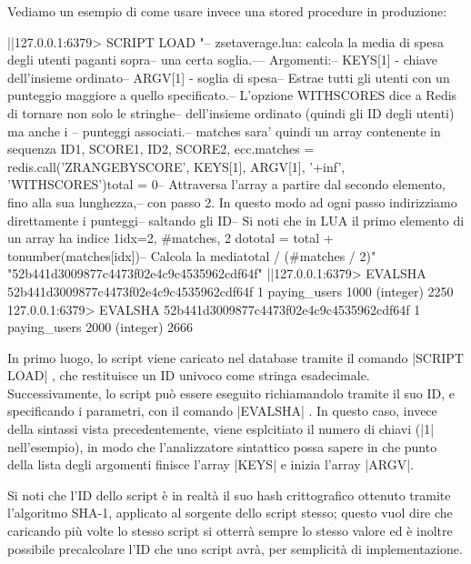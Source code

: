 Vediamo un esempio di come usare invece una stored procedure in produzione:

\begin{commentedsource}[style=redis]
|\lnote|127.0.0.1:6379> SCRIPT LOAD "-- zsetaverage.lua: calcola la media di spesa degli utenti paganti sopra\n-- una certa soglia.\n--\n-- Argomenti:\n--     KEYS[1] - chiave dell'insieme ordinato\n--     ARGV[1] - soglia di spesa\n\n-- Estrae tutti gli utenti con un punteggio maggiore a quello specificato.\n-- L'opzione WITHSCORES dice a Redis di tornare non solo le stringhe\n-- dell'insieme ordinato (quindi gli ID degli utenti) ma anche i \n-- punteggi associati.\n-- matches sara' quindi un array contenente in sequenza ID1, SCORE1, ID2, SCORE2, ecc.\nlocal matches = redis.call('ZRANGEBYSCORE', KEYS[1], ARGV[1], '+inf', 'WITHSCORES')\n\nlocal total = 0\n\n-- Attraversa l'array a partire dal secondo elemento, fino alla sua lunghezza,\n-- con passo 2. In questo modo ad ogni passo indirizziamo direttamente i punteggi\n-- saltando gli ID\n-- Si noti che in LUA il primo elemento di un array ha indice 1\nfor idx=2, #matches, 2 do\n    total = total + tonumber(matches[idx])\nend\n\n-- Calcola la media\nreturn total / (#matches / 2)\n"
"52b441d3009877c4473f02e4c9c4535962cdf64f"
|\lnote|127.0.0.1:6379> EVALSHA 52b441d3009877c4473f02e4c9c4535962cdf64f 1 paying_users 1000
(integer) 2250
127.0.0.1:6379> EVALSHA 52b441d3009877c4473f02e4c9c4535962cdf64f 1 paying_users 2000
(integer) 2666
\end{commentedsource}

In primo luogo, lo script viene caricato nel database tramite il comando \cverb|SCRIPT LOAD|
, che restituisce un ID univoco come stringa esadecimale. Successivamente, lo script può
essere eseguito richiamandolo tramite il suo ID, e specificando i parametri, con il comando
\cverb|EVALSHA| . In questo caso, invece della sintassi vista precedentemente,
viene esplcitiato il numero di chiavi (\cverb|1| nell'esempio), in modo che l'analizzatore
sintattico possa sapere in che punto della lista degli argomenti finisce l'array \cverb|KEYS| e
inizia l'array \cverb|ARGV|.

Si noti che l'ID dello script è in realtà il suo hash crittografico ottenuto tramite l'algoritmo
SHA-1, applicato al sorgente dello script stesso; questo vuol dire che caricando più volte lo stesso
script si otterrà sempre lo stesso valore ed è inoltre possibile precalcolare l'ID che uno script
avrà, per semplicità di implementazione.

